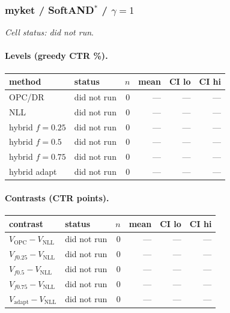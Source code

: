 \documentclass[10pt,a4paper]{article}
\begin{document}
\subsubsection{myket / SoftAND$^*$ / $\gamma=1$}
\emph{Cell status: did not run}.
\paragraph{Levels (greedy CTR \%).}
{\centering\small\begin{tabular}{llrrrr}
\toprule method & status & $n$ & mean & CI lo & CI hi \\
\midrule
OPC/DR & did not run & 0 & --- & --- & --- \\
NLL & did not run & 0 & --- & --- & --- \\
hybrid $f{=}0.25$ & did not run & 0 & --- & --- & --- \\
hybrid $f{=}0.5$ & did not run & 0 & --- & --- & --- \\
hybrid $f{=}0.75$ & did not run & 0 & --- & --- & --- \\
hybrid adapt & did not run & 0 & --- & --- & --- \\
\bottomrule\end{tabular}\par}
\paragraph{Contrasts (CTR points).}
{\centering\small\begin{tabular}{llrrrr}
\toprule contrast & status & $n$ & mean & CI lo & CI hi \\
\midrule
$V_{\mathrm{OPC}}-V_{\mathrm{NLL}}$ & did not run & 0 & --- & --- & --- \\
$V_{f0.25}-V_{\mathrm{NLL}}$ & did not run & 0 & --- & --- & --- \\
$V_{f0.5}-V_{\mathrm{NLL}}$ & did not run & 0 & --- & --- & --- \\
$V_{f0.75}-V_{\mathrm{NLL}}$ & did not run & 0 & --- & --- & --- \\
$V_{\mathrm{adapt}}-V_{\mathrm{NLL}}$ & did not run & 0 & --- & --- & --- \\
\bottomrule\end{tabular}\par}
\end{document}
